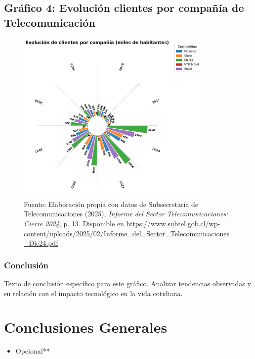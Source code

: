 \documentclass[12pt, a4paper]{article}
\begin{document}
\subsection*{Gráfico 4: Evolución clientes por compañía de Telecomunicación}
\begin{figure}[H]
    \centering
    \includegraphics[width=0.85\textwidth]{images/graph2_JG.png}
    \caption{
        Fuente: Elaboración propia con datos de Subsecretaría de Telecomunicaciones (2025), 
        \textit{Informe del Sector Telecomunicaciones: Cierre 2024}, p. 13. 
        Disponible en \url{https://www.subtel.gob.cl/wp-content/uploads/2025/02/Informe_del_Sector_Telecomunicaciones_Dic24.pdf}
    }
\end{figure}

\subsubsection*{Conclusión}
Texto de conclusión específico para este gráfico. Analizar tendencias observadas y su relación con el impacto tecnológico en la vida cotidiana.




\section*{Conclusiones Generales}
\begin{itemize}
    \item Opcional**
\end{itemize}
\end{document}
